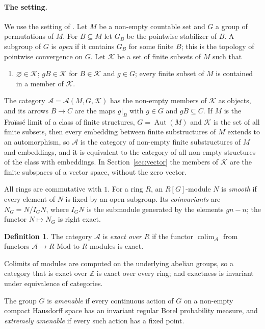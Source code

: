 \documentclass[11pt,a4paper]{article}
\theoremstyle{definition}
\newtheorem{definition}[theorem]{Definition}
\newcommand{\A}{\mathcal{A}}
\newcommand{\K}{\mathcal{K}}
\newcommand{\Z}{\mathbb{Z}}
\newcommand{\colim}{\operatorname{colim}}
\newcommand{\Aut}{\operatorname{Aut}}
\begin{document}
\paragraph{The setting.} We use the setting of \cite[\S3.1]{D1}. Let $M$ be a non-empty countable set and $G$ a group of permutations of $M$. For $B\subseteq M$ let
$G_B$ be the pointwise stabilizer of $B$. A subgroup of $G$ is \emph{open} if
it contains $G_B$ for some finite $B$; this is the topology of pointwise
convergence on $G$. Let $\K$ be a set of finite subsets of $M$ such that
\begin{enumerate}
\item[\textup{(K1)}] $\varnothing\in\K$; $gB\in\K$ for $B\in\K$ and $g\in G$;
every finite subset of $M$ is contained in a member of $\K$.
\end{enumerate}
The category $\A=\A(M,G,\K)$ has the non-empty members of $\K$ as objects,
and its arrows $B\to C$ are the maps $g|_B$ with $g\in G$ and $gB\subseteq C$.
If $M$ is the Fra\"iss\'e limit of a class of finite structures, $G=\Aut(M)$
and $\K$ is the set of all finite subsets, then every embedding between
finite substructures of $M$ extends to an automorphism, so $\A$ is the
category of non-empty finite substructures of $M$ and embeddings, and it is
equivalent to the category of all non-empty structures of the class with
embeddings. In Section~\ref{sec:vector} the members of $\K$ are the finite
subspaces of a vector space, without the zero vector.

All rings are commutative with $1$. For a ring $R$, an $R[G]$-module $N$ is
\emph{smooth} if every element of $N$ is fixed by an open subgroup. Its
\emph{coinvariants} are $N_G=N/I_GN$, where $I_GN$ is the submodule generated
by the elements $gn-n$; the functor $N\mapsto N_G$ is right exact.

\begin{definition}\label{def:exact}
The category $\A$ is \emph{exact over $R$} if the functor
$\colim_{\A}$ from functors $\A\to R\text{-Mod}$ to $R$-modules is exact.
\end{definition}

Colimits of modules are computed on the underlying abelian groups, so a
category that is exact over $\Z$ is exact over every ring; and exactness is
invariant under equivalence of categories.

The group $G$ is \emph{amenable} if every continuous action of $G$ on a
non-empty compact Hausdorff space has an invariant regular Borel probability measure, and \emph{extremely amenable} if every such action has a fixed
point.
\end{document}
